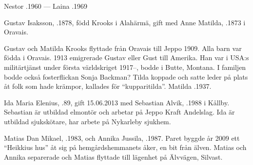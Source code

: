 Nestor .1960  ---  Laina .1969


%
Gustav Isaksson, .1878, född Krooks i Alahärmä, gift med Anne Matilda, .1873 i Oravais.
\begin{jhchildren}
  \item {}
  \item {}
  \item {}
\end{jhchildren}
Gustav och Matilda Krooks flyttade från Oravais till Jeppo 1909. Alla barn var födda i Oravais. 1913 emigrerade Gustav eller Gust till Amerika. Han var i USA:s militärtjänst under första världskriget 1917--, bodde i Butte, Montana. I familjen bodde också fosterflickan Sonja Backman? Tilda koppade och satte leder på plats åt folk som hade krämpor,  kallades för ``kupparitilda''. 	Matilda .1937.




%



%
Ida Maria Elenius, .89, gift 15.06.2013 med Sebastian Alvik, .1988 i Kållby. Sebastian är utbildad elmontör och arbetar på Jeppo Kraft Andelslag. Ida är utbildad sjukskötare, har arbete på Nykarleby sjukhem.
\begin{jhchildren}
  \item {}
  \item {}
\end{jhchildren}


%
Matias Dan Mikael, .1983, och Annika Jussila, .1987. Paret byggde år 2009 ett ``Heikkius hus'' åt sig på hemgårdshemmanets åker, en bit från älven. Matias och Annika separerade och Matias flyttade till lägenhet på Älvvägen, Silvast.
